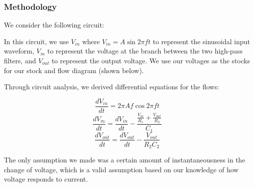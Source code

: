 \documentclass[11pt]{article}
\begin{document}
    \hypertarget{methodology}{%
\subsubsection{Methodology}\label{methodology}}

We consider the following circuit:

In this circuit, we use \(V_{in}\) where \(V_{in} = A\sin{2\pi{ft}}\) to
represent the sinusoidal input waveform, \(V_m\) to represent the
voltage at the branch between the two high-pass filters, and \(V_{out}\)
to represent the output voltage. We use our voltages as the stocks for
our stock and flow diagram (shown below).

    Through circuit analysis, we derived differential equations for the
flows:

\[\frac{dV_{in}}{dt} = 2\pi{Af\cos{2\pi{ft}}}\]
\[\frac{dV_m}{dt} = \frac{dV_{in}}{dt} - \frac{\frac{V_m}{R_1} + \frac{V_{out}}{R_2}}{C_1}\]
\[\frac{dV_{out}}{dt} = \frac{dV_{out}}{dt} - \frac{V_{out}}{R_2C_2}\]

The only assumption we made was a certain amount of instantaneousness in
the change of voltage, which is a valid assumption based on our
knowledge of how voltage responds to current.
\end{document}
